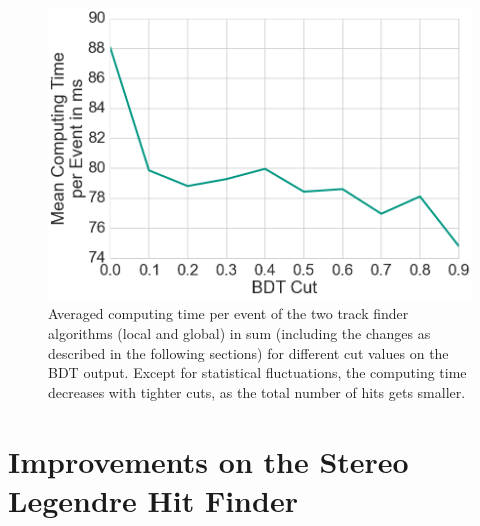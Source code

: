 \begin{figure}
  \centering
  \includegraphics[width=0.7\linewidth]{figures/workflow/background_hit_finder_performance.png}
  \caption{Averaged computing time per event of the two track finder algorithms (local and global) in sum (including the changes as described in the following sections) for different cut values on the BDT output. Except for statistical fluctuations, the computing time decreases with tighter cuts, as the total number of hits gets smaller.}
  \label{fig-performance-clusters}
\end{figure}



\section{Improvements on the Stereo Legendre Hit Finder} \label{section-stereo}

